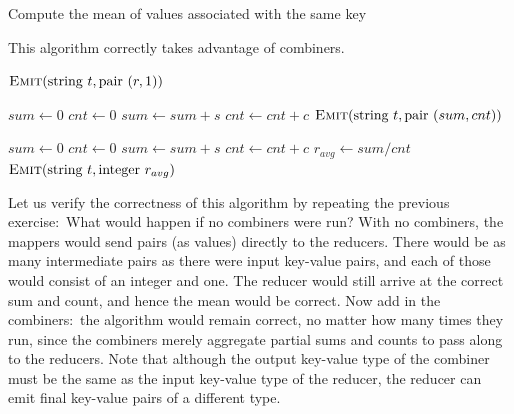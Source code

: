 \begin{algorithm}[t]
\caption{Compute the mean of values associated with the same key}
\label{algorithm:chapter3:average-efficient}
This algorithm correctly takes advantage of combiners.

\algrenewcommand{}
\algrenewcommand{}
  \begin{algorithmic}[1]
    \State $\textsc{Emit}(\textrm{string }t, \textrm{pair }(r, 1))$
    \EndProcedure
    \EndFunction
  \end{algorithmic}

  \begin{algorithmic}[1]
    \State $sum \gets 0$
    \State $cnt \gets 0$
    \State $sum \gets sum + s$
    \State $cnt \gets cnt + c$
    \EndFor
    \State $\textsc{Emit}(\textrm{string }t, \textrm{pair }(sum, cnt))$
    \EndProcedure
    \EndFunction
  \end{algorithmic}

  \begin{algorithmic}[1]
    \State $sum \gets 0$
    \State $cnt \gets 0$
    \State $sum \gets sum + s$
    \State $cnt \gets cnt + c$
    \EndFor
    \State $r_{avg} \gets sum/cnt$
    \State $\textsc{Emit}(\textrm{string }t, \textrm{integer } r_{avg})$
    \EndProcedure
    \EndFunction
  \end{algorithmic}
\end{algorithm}

Let us verify the correctness of this algorithm by repeating the
previous exercise:\ What would happen if no combiners were run?  With
no combiners, the mappers would send pairs (as values) directly to the
reducers.  There would be as many intermediate pairs as there were
input key-value pairs, and each of those would consist of an integer
and one.  The reducer would still arrive at the correct sum and count,
and hence the mean would be correct.  Now add in the combiners:\ the
algorithm would remain correct, no matter how many times they run,
since the combiners merely aggregate partial sums and counts to pass
along to the reducers.  Note that although the output key-value type
of the combiner must be the same as the input key-value type of the
reducer, the reducer can emit final key-value pairs of a different
type.

